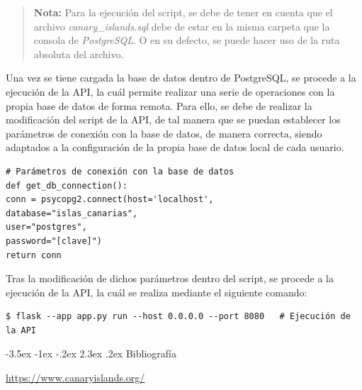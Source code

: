 \documentclass[11pt]{report}
\makeatletter
\renewcommand\chapter{\@startsection{chapter}{0}{\z@}%
    {-3.5ex \@plus -1ex \@minus -.2ex}%
    {2.3ex \@plus.2ex}%
    {\normalfont\Large\bfseries}}
\makeatother
\begin{document}
\begin{quote}
\textbf{Nota:} Para la ejecución del script, se debe de tener en cuenta que el archivo \emph{canary\_islands.sql} debe de estar en la misma carpeta que la consola de \emph{PostgreSQL}. O en su defecto, se puede hacer uso de la ruta absoluta del archivo.
\end{quote}

Una vez se tiene cargada la base de datos dentro de PostgreSQL, se procede a la ejecución de la API, la cuál permite realizar una serie de operaciones con la propia base de datos de forma remota. Para ello, se debe de realizar la modificación del script de la API, de tal manera que se puedan establecer los parámetros de conexión con la base de datos, de manera correcta, siendo adaptados a la configuración de la propia base de datos local de cada usuario.

\begin{verbatim}
# Parámetros de conexión con la base de datos
def get_db_connection():
conn = psycopg2.connect(host='localhost',
database="islas_canarias",
user="postgres",
password="[clave]")
return conn
\end{verbatim}

Tras la modificación de dichos parámetros dentro del script, se procede a la ejecución de la API, la cuál se realiza mediante el siguiente comando:

\begin{verbatim}
$ flask --app app.py run --host 0.0.0.0 --port 8080   # Ejecución de la API
\end{verbatim}

\chapter{Bibliografía}
\begin{thebibliography}{99}
       \url{https://www.canaryislands.org/}

\end{thebibliography}
\end{document}
